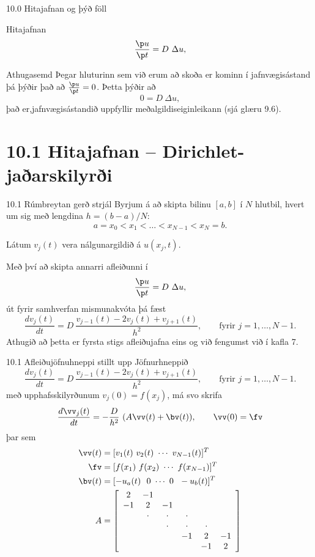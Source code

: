 \begin{frame}{10.0 Hitajafnan og þýð föll}
\begin{block}{Hitajafnan}
  $$
  \frac{\p u}{\p t} = D\  \Delta u,
 $$
 \end{block}
 
 \begin{block}{Athugasemd}
  Þegar hluturinn sem við erum að skoða er kominn í jafnvægisástand þá
  þýðir það að $\frac{\p u}{\p t} = 0$. \pause Þetta þýðir að 
  $$
     0 =  D\ \Delta u,
  $$
  það er,jafnvægisástandið uppfyllir meðalgildiseiginleikann (sjá glæru 9.6).
 \end{block}
 
\end{frame}

\section*{10.1 Hitajafnan --  Dirichlet-jaðarskilyrði }

\begin{frame}{10.1 Rúmbreytan gerð strjál }
 Byrjum á að skipta bilinu $[a,b]$ í $N$ hlutbil, hvert um sig með lengdina
 $h=(b-a)/N$:
 $$
    a = x_0 < x_1 < \ldots < x_{N-1} < x_N = b.
 $$ \pause
 
 Látum $v_j(t)$ vera nálgunargildið á $u(x_j,t)$.
 
 Með því að skipta annarri afleiðunni í 
 $$
 \frac{\p u}{\p t} =  D\ \Delta u,
 $$
 út fyrir samhverfan mismunakvóta þá fæst
 $$ 
 \frac{d v_j(t)}{d t} =  D\  \frac{v_{j-1}(t) -2 v_j(t) + v_{j+1}(t)}{h^2}, \qquad
 \text{fyrir } j=1,\ldots,N-1.
 $$
 Athugið að þetta er fyrsta stigs afleiðujafna eins og við fengumst við í kafla 7.
\end{frame}

\begin{frame}{10.1 Afleiðujöfnuhneppi stillt upp}
 Jöfnurhneppið 
 $$ 
 \frac{d v_j(t)}{d t} =  D\  \frac{v_{j-1}(t) -2 v_j(t) + v_{j+1}(t)}{h^2}, \qquad
 \text{fyrir } j=1,\ldots,N-1.
 $$ \pause
 með upphafsskilyrðunum $v_j(0) = f(x_j)$, \pause
 má svo skrifa
 $$ 
 \frac{d \vv_j(t)}{d t} =  -\frac{D}{h^2}\  (A\vv(t) + \bv(t)), \qquad \vv(0)=\fv
 $$
 þar sem 
 \begin{align*}
  \vv(t) &= [v_1(t) \ v_2(t) \ \cdots \ v_{N-1}(t) ]^T\\
  \fv &= [ f(x_1) \ f(x_2) \ \cdots \ f(x_{N-1}) ]^T\\
  \bv(t) &= [ -u_a(t) \ \ 0 \ \cdots \ 0 \ \ -u_b(t) ]^T \\
  A &=  \left[\begin{array}{cccccc}
2 & -1 &   &   &   &  \\
-1 & 2 & -1 &   &   &  \\
  & \cdot & \cdot & \cdot &   &  \\
  &   & \cdot & \cdot & \cdot &  \\
  &   &  & -1 & 2 & -1\\
  &   &   &   & -1 & 2
      \end{array}\right]
 \end{align*}
\end{frame}

